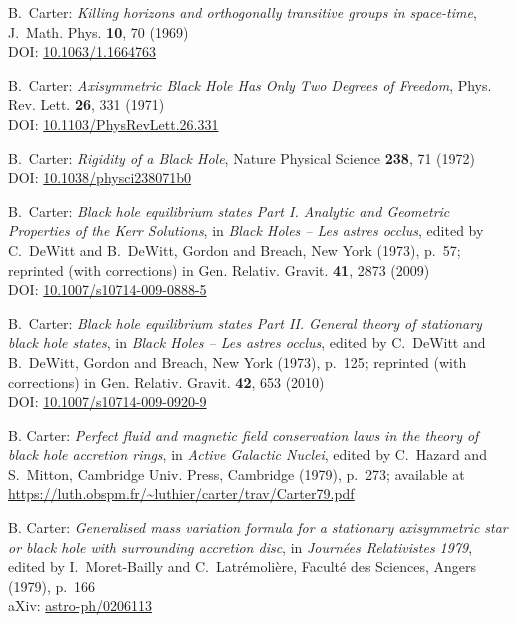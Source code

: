 \begin{thebibliography}{123}
B.~Carter:
{\em Killing horizons and orthogonally transitive groups in space-time},
J.~Math. Phys. {\bf 10}, 70 (1969)\\
DOI: \href{https://doi.org/10.1063/1.1664763}{10.1063/1.1664763}

B.~Carter:
{\em Axisymmetric Black Hole Has Only Two Degrees of Freedom},
Phys. Rev. Lett. {\bf 26}, 331 (1971)\\
DOI: \href{https://doi.org/10.1103/PhysRevLett.26.331}{10.1103/PhysRevLett.26.331}

B.~Carter:
{\em Rigidity of a Black Hole},
Nature Physical Science {\bf 238}, 71 (1972)\\
DOI: \href{https://doi.org/10.1038/physci238071b0}{10.1038/physci238071b0}

B.~Carter:
{\em Black hole equilibrium states Part I.
Analytic and Geometric Properties of the Kerr Solutions},
in {\em Black Holes -- Les astres occlus},  edited by C.~DeWitt and B.~DeWitt,
Gordon and Breach, New York (1973), p.~57; reprinted (with corrections) in
Gen. Relativ. Gravit. {\bf 41}, 2873 (2009)\\
DOI: \href{https://doi.org/10.1007/s10714-009-0888-5}{10.1007/s10714-009-0888-5}

B.~Carter:
{\em Black hole equilibrium states Part II. General theory of stationary black hole states}, in {\em Black Holes -- Les astres occlus}, edited by C.~DeWitt and B.~DeWitt,
Gordon and Breach, New York (1973), p.~125; reprinted (with corrections) in
Gen. Relativ. Gravit. {\bf 42}, 653 (2010)\\
DOI: \href{https://doi.org/10.1007/s10714-009-0920-9}{10.1007/s10714-009-0920-9}

B. Carter:
{\em Perfect fluid and magnetic field conservation laws in the theory of black hole accretion rings},
in {\em Active Galactic Nuclei}, edited by C.~Hazard and S.~Mitton,
Cambridge Univ. Press, Cambridge (1979), p.~273; available at\\
\url{https://luth.obspm.fr/~luthier/carter/trav/Carter79.pdf}

B. Carter:
{\em Generalised mass variation formula for a stationary axisymmetric star or black hole with surrounding accretion disc},
in {\em Journées Relativistes 1979}, edited by  I.~Moret-Bailly and C.~Latrémolière,
Faculté des Sciences, Angers (1979), p.~166\\
aXiv: \href{https://arxiv.org/abs/astro-ph/0206113}{astro-ph/0206113}


\end{thebibliography}
